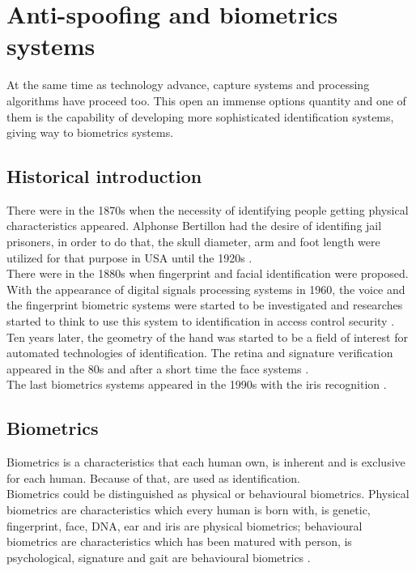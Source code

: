 \section{Anti-spoofing and biometrics systems}
At the same time as technology advance, capture systems and processing algorithms have proceed too. This open an immense options quantity and one of them is the capability of developing more sophisticated identification systems, giving way to biometrics systems.\\

\subsection{Historical introduction}
There were in the 1870s when the necessity of identifying people getting physical characteristics appeared. Alphonse Bertillon had the desire of identifing jail prisoners, in order to do that, the skull diameter, arm and foot length were utilized for that purpose in USA until the 1920s \cite{Intro_biometrics}.\\

There were in the 1880s when fingerprint and facial identification were proposed. With the appearance of digital signals processing systems in 1960, the voice and the fingerprint biometric systems were started to be investigated and researches started to think to use this system to identification in access control security \cite{Intro_biometrics}.\\
 
Ten years later, the geometry of the hand was started to be a field of interest for automated technologies of identification. The retina and signature verification appeared in the 80s and after a short time the face systems \cite{Intro_biometrics}.\\

The last biometrics systems appeared in the 1990s with the iris recognition \cite{Intro_biometrics}.\\

\subsection{Biometrics}
Biometrics is a characteristics that each human own, is inherent and is exclusive for each human. Because of that, are used as identification.\\

Biometrics could be distinguished as physical or behavioural biometrics. Physical biometrics are characteristics which every human is born with, is genetic, fingerprint, face, DNA, ear and iris are physical biometrics; behavioural biometrics are characteristics which has been matured with person, is  psychological, signature and gait are behavioural biometrics \cite{biometrics_beha}.\\

